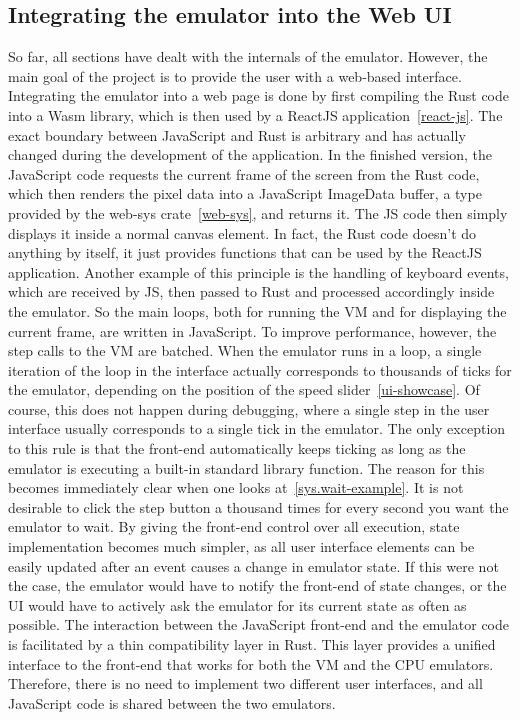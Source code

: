 \subsection{Integrating the emulator into the Web UI}
So far, all sections have dealt with the internals of the emulator. However, the main goal of the project is to provide the user with a web-based interface.
Integrating the emulator into a web page is done by first compiling the Rust code into a Wasm library, which is then used by a ReactJS application~\ref{react-js}.
The exact boundary between JavaScript and Rust is arbitrary and has actually changed during the development of the application.
In the finished version, the JavaScript code requests the current frame of the screen from the Rust code, which then renders the pixel data into a JavaScript ImageData buffer, a type provided by the web-sys crate~\ref{web-sys}, and returns it. The JS code then simply displays it inside a normal canvas element.
In fact, the Rust code doesn't do anything by itself, it just provides functions that can be used by the ReactJS application.
Another example of this principle is the handling of keyboard events, which are received by JS, then passed to Rust and processed accordingly inside the emulator.
So the main loops, both for running the VM and for displaying the current frame, are written in JavaScript.
To improve performance, however, the step calls to the VM are batched.
When the emulator runs in a loop, a single iteration of the loop in the interface actually corresponds to thousands of ticks for the emulator, depending on the position of the speed slider~\ref{ui-showcase}.
Of course, this does not happen during debugging, where a single step in the user interface usually corresponds to a single tick in the emulator. The only exception to this rule is that the front-end automatically keeps ticking as long as the emulator is executing a built-in standard library function. The reason for this becomes immediately clear when one looks at~\cref{sys.wait-example}. It is not desirable to click the step button a thousand times for every second you want the emulator to wait.
By giving the front-end control over all execution, state implementation becomes much simpler, as all user interface elements can be easily updated after an event causes a change in emulator state.
If this were not the case, the emulator would have to notify the front-end of state changes, or the UI would have to actively ask the emulator for its current state as often as possible.
The interaction between the JavaScript front-end and the emulator code is facilitated by a thin compatibility layer in Rust. This layer provides a unified interface to the front-end that works for both the VM and the CPU emulators.
Therefore, there is no need to implement two different user interfaces, and all JavaScript code is shared between the two emulators.

